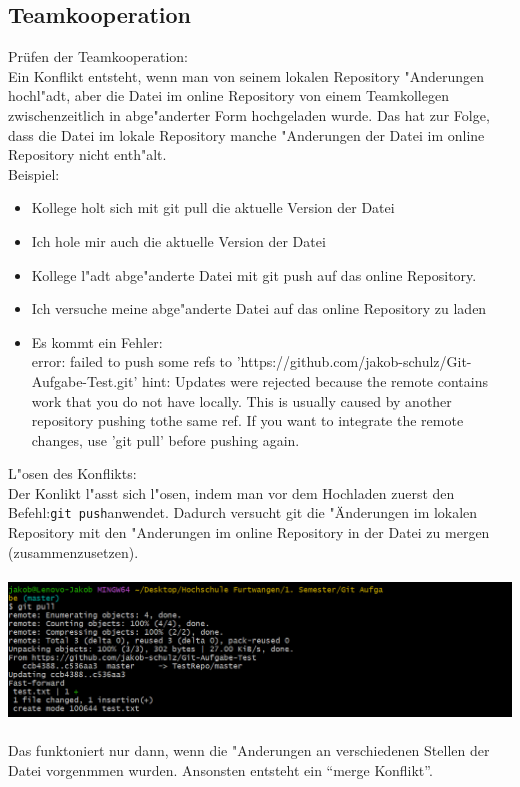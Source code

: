 \documentclass[a4paper,11pt,titlepage]{article}
\begin{document}
\subsection{Teamkooperation}
Prüfen der Teamkooperation:\\
Ein Konflikt entsteht, wenn man von seinem lokalen Repository "Anderungen hochl"adt, aber die Datei im online Repository von einem Teamkollegen zwischenzeitlich in abge"anderter Form hochgeladen wurde. Das hat zur Folge, dass die Datei im lokale Repository manche "Anderungen der Datei im online Repository nicht enth"alt. \\
Beispiel:
\begin{itemize}
\item Kollege holt sich mit git pull die aktuelle Version der Datei
\item Ich hole mir auch die aktuelle Version der Datei
\item Kollege l"adt abge"anderte Datei mit git push auf das online Repository.
\item Ich versuche meine abge"anderte Datei auf das online Repository zu laden
\item Es kommt ein Fehler:\\
error: failed to push some refs to 'https://github.com/jakob-schulz/Git-Aufgabe-Test.git'
hint: Updates were rejected because the remote contains work that you do not have locally. This is usually caused by another repository pushing tothe same ref. If you want to integrate the remote changes, use 'git pull' before pushing again.
\end{itemize}
L"osen des Konflikts:\\
Der Konlikt l"asst sich l"osen, indem man vor dem Hochladen zuerst den Befehl:\verb+git push+anwendet. 
Dadurch versucht git die "Änderungen im lokalen Repository mit den "Anderungen im online Repository  in der Datei zu mergen (zusammenzusetzen).\\
\\
\includegraphics[width = 13 cm]{git_merge.png}\\
\\
Das funktoniert nur dann, wenn die "Anderungen an verschiedenen Stellen der Datei vorgenmmen wurden. Ansonsten entsteht ein "`merge Konflikt"'.\\
\end{document}
